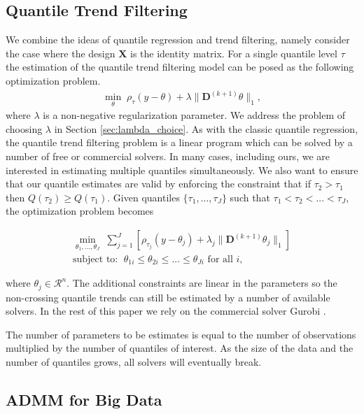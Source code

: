\documentclass[12pt]{article}
\begin{document}
	\subsection{Quantile Trend Filtering}
	
	We combine the ideas of quantile regression and trend filtering, namely consider the case where the design $\mathbf{X}$ is the identity matrix. For a single quantile level $\tau$ the estimation of the quantile trend filtering model can be posed as the following optimization problem.
	\begin{eqnarray}
	\label{eq:quantile_trend}
	\underset{\theta}{\min}\; \rho_\tau(y - \theta) + \lambda \lVert \mathbf{D}^{(k+1)} \theta \rVert_1,
	\end{eqnarray}
	where $\lambda$ is a non-negative regularization parameter. We address the problem of choosing $\lambda$ in Section \ref{sec:lambda_choice}. As with the classic quantile regression, the quantile trend filtering problem is a linear program which can be solved by a number of free or commercial solvers. In many cases, including ours, we are interested in estimating multiple quantiles simultaneously. We also want to ensure that our quantile estimates are valid by enforcing the constraint that if $\tau_2 > \tau_1$ then $Q(\tau_2) \ge Q(\tau_1)$. Given quantiles $\{\tau_1, ..., \tau_J\}$ such that $\tau_1 < \tau_2 < ... < \tau_J$, the optimization problem becomes 
	
	\begin{eqnarray}
	\label{eq:noncross_trend}
	\underset{\theta_1, ..., \theta_J}{\min}\; \sum_{j=1}^J \left [\rho_{\tau_j}(y - \theta_{j}) + 
	\lambda_j \lVert \mathbf{D}^{(k+1)} \theta_j \rVert_1 \right ] \\
	 \text{subject to: }\; \theta_{1i} \le \theta_{2i} \le ... \le \theta_{Ji} \text{ for all } i,
	\end{eqnarray}
	
	where $\theta_j \in \mathcal{R}^n$. The additional constraints are linear in the parameters so the non-crossing quantile trends can still be estimated by a number of available solvers. In the rest of this paper we rely on the commercial solver Gurobi \citep{gurobi}. 
	
	The number of parameters to be estimates is equal to the number of observations multiplied by the number of quantiles of interest. As the size of the data and the number of quantiles grows, all solvers will eventually break. 
	
	\subsection{ADMM for Big Data}
	
\end{document}
